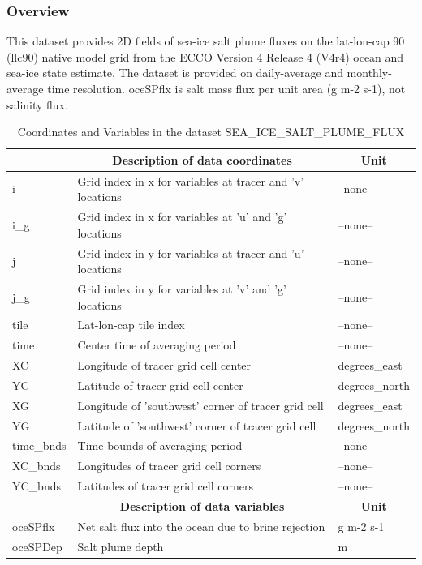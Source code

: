 \subsubsection{Overview}
This dataset provides 2D fields of sea-ice salt plume fluxes on the lat-lon-cap 90 (llc90) native model grid from the ECCO Version 4 Release 4 (V4r4) ocean and sea-ice state estimate. The dataset is provided on daily-average and monthly-average time resolution. oceSPflx is salt mass flux per unit area (g m-2 s-1), not salinity flux. 
\begin{longtable}{|m{}|m{}|m{}|}
\caption{Coordinates and Variables in the dataset SEA\_ICE\_SALT\_PLUME\_FLUX}
\label{tab:table-SEA_ICE_SALT_PLUME_FLUX-fields} \\ 
\hline \endhead \hline \endfoot
\rowcolor{lightgray} \multicolumn{1}{|c|}{\textbf{Coordinates}} & \multicolumn{1}{|c|}{\textbf{Description of data coordinates}} &  \multicolumn{1}{|c|}{\textbf{Unit}}\\ \hline
i &Grid index in x for variables at tracer and 'v' locations &--none--  \\ \hline
i\_g &Grid index in x for variables at 'u' and 'g' locations &--none--  \\ \hline
j &Grid index in y for variables at tracer and 'u' locations &--none--  \\ \hline
j\_g &Grid index in y for variables at 'v' and 'g' locations &--none--  \\ \hline
tile &Lat-lon-cap tile index &--none--  \\ \hline
time &Center time of averaging period &--none--  \\ \hline
XC &Longitude of tracer grid cell center &degrees\_east  \\ \hline
YC &Latitude of tracer grid cell center &degrees\_north  \\ \hline
XG &Longitude of 'southwest' corner of tracer grid cell &degrees\_east  \\ \hline
YG &Latitude of 'southwest' corner of tracer grid cell &degrees\_north  \\ \hline
time\_bnds &Time bounds of averaging period &--none--  \\ \hline
XC\_bnds &Longitudes of tracer grid cell corners &--none--  \\ \hline
YC\_bnds &Latitudes of tracer grid cell corners &--none--  \\ \hline
\rowcolor{lightgray} \multicolumn{1}{|c|}{\textbf{Variables}} & \multicolumn{1}{|c|}{\textbf{Description of data variables}} &  \multicolumn{1}{|c|}{\textbf{Unit}}\\ \hline
oceSPflx &Net salt flux into the ocean due to brine rejection &g m-2 s-1  \\ \hline
oceSPDep &Salt plume depth &m  \\ \hline
\end{longtable}

